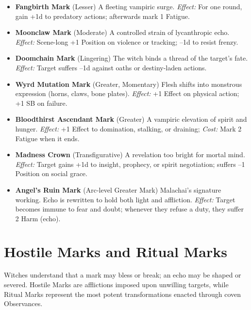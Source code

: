 \documentclass[11pt]{book}
\begin{document}
\begin{itemize}[leftmargin=1.5em]
    \item \textbf{Fangbirth Mark} (Lesser)  
    A fleeting vampiric surge.  
    \emph{Effect:} For one round, gain +1d to predatory actions; afterwards mark 1 Fatigue.

    \item \textbf{Moonclaw Mark} (Moderate)  
    A controlled strain of lycanthropic echo.  
    \emph{Effect:} Scene-long +1 Position on violence or tracking; --1d to resist frenzy.

    \item \textbf{Doomchain Mark} (Lingering)  
    The witch binds a thread of the target's fate.  
    \emph{Effect:} Target suffers --1d against oaths or destiny-laden actions.

    \item \textbf{Wyrd Mutation Mark} (Greater, Momentary)  
    Flesh shifts into monstrous expression (horns, claws, bone plates).  
    \emph{Effect:} +1 Effect on physical action; +1 SB on failure.

    \item \textbf{Bloodthirst Ascendant Mark} (Greater)  
    A vampiric elevation of spirit and hunger.  
    \emph{Effect:} +1 Effect to domination, stalking, or draining;  
    \emph{Cost:} Mark 2 Fatigue when it ends.

    \item \textbf{Madness Crown} (Transfigurative)  
    A revelation too bright for mortal mind.  
    \emph{Effect:} Target gains +1d to insight, prophecy, or spirit negotiation;  
    suffers --1 Position on social grace.

    \item \textbf{Angel's Ruin Mark} (Arc-level Greater Mark)  
    Malachai's signature working.  
    Echo is rewritten to hold both light and affliction.  
    \emph{Effect:} Target becomes immune to fear and doubt;  
    whenever they refuse a duty, they suffer 2 Harm (echo).
\end{itemize}

\section*{Hostile Marks and Ritual Marks}

Witches understand that a mark may bless or break; an echo may be shaped or severed.
Hostile Marks are afflictions imposed upon unwilling targets, while Ritual Marks represent
the most potent transformations enacted through coven Observances.
\end{document}

